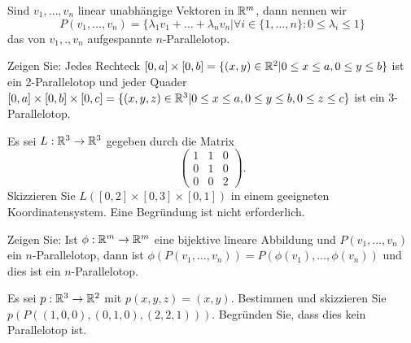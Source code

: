 \begin{Problem}
	Sind $v_1,\dots, v_n$ linear unabhängige Vektoren in $\mathbb{R}^m$, dann nennen wir
	\[P (v_1 ,\dots , v_n ) = \{\lambda_1 v_1 + \dots + \lambda_n v_n |\forall i \in \{1, \dots , n\} : 0 \le \lambda_i \le 1\}\]
	das von $v_1 , .  , v_n$ aufgespannte $n$-Parallelotop.
	\begin{parts}
		\item Zeigen Sie: Jedes Rechteck $[0, a] \times [0, b] = \{(x, y) \in \mathbb{R}^2|0 \le x \le a, 0 \le y \le b\}$ ist ein 2-Parallelotop und jeder Quader $[0, a] \times [0, b] \times [0, c] = \{(x, y, z) \in \mathbb{R}^3 |0 \le x \le a, 0 \le y \le b, 0 \le z \le c\}$ ist ein 3-Parallelotop.
		\item Es sei $L:\mathbb{R}^3\to \mathbb{R}^3$ gegeben durch die Matrix
		\[\begin{pmatrix}
			1 & 1 & 0 \\ 0 & 1 & 0 \\ 0 & 0 & 2
		\end{pmatrix}.\]
		Skizzieren Sie $L([0, 2] \times [0, 3] \times [0, 1])$ in einem geeigneten Koordinatensystem. Eine Begründung ist nicht erforderlich.
		\item Zeigen Sie: Ist $\phi : \mathbb{R}^m \to \mathbb{R}^m$ eine bijektive lineare Abbildung und $P (v_1 , \dots , v_n )$ ein $n$-Parallelotop, dann ist $\phi(P (v_1 , \dots , v_n )) = P (\phi(v_1), \dots , \phi(v_n ))$ und dies ist ein $n$-Parallelotop.
		\item Es sei $p : \mathbb{R}^3 \to \mathbb{R}^2$ mit $p(x, y, z) = (x, y)$. Bestimmen und skizzieren Sie $p(P ((1, 0, 0), (0, 1, 0), (2, 2, 1)))$. Begründen Sie, dass dies kein Parallelotop ist.
	\end{parts}
\end{Problem}
